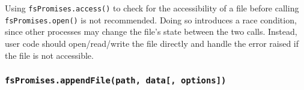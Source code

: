 \begin{Shaded}
\begin{Highlighting}[]
\OperatorTok{,} \OperatorTok{;}

\NormalTok{ \{}
   \NormalTok{(}\OperatorTok{,} \OperatorTok{|}\NormalTok{)}\OperatorTok{;}
  \NormalTok{(}\NormalTok{)}\OperatorTok{;}
\NormalTok{\} }\NormalTok{ \{}
  \NormalTok{(}\NormalTok{)}\OperatorTok{;}
\NormalTok{\}}
\end{Highlighting}
\end{Shaded}

Using \texttt{fsPromises.access()} to check for the accessibility of a
file before calling \texttt{fsPromises.open()} is not recommended. Doing
so introduces a race condition, since other processes may change the
file's state between the two calls. Instead, user code should
open/read/write the file directly and handle the error raised if the
file is not accessible.

\subsubsection{\texorpdfstring{\texttt{fsPromises.appendFile(path,\ data{[},\ options{]})}}{fsPromises.appendFile(path, data{[}, options{]})}}\label{fspromises.appendfilepath-data-options}

